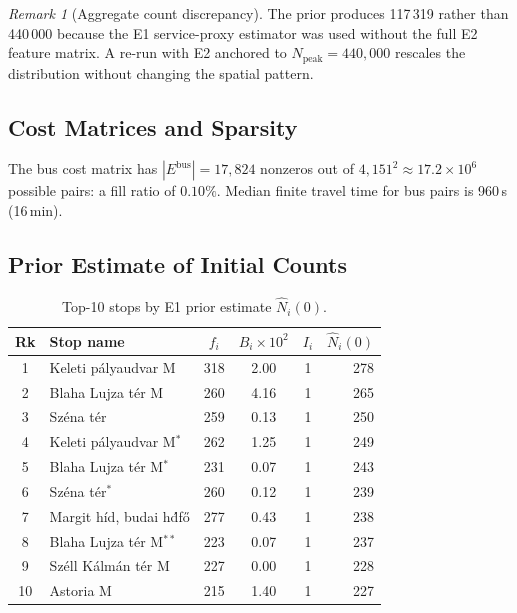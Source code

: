 \documentclass[11pt,a4paper]{article}
\theoremstyle{plain}
\theoremstyle{definition}
\theoremstyle{remark}
\newtheorem{remark}[theorem]{Remark}
\begin{document}
\begin{remark}[Aggregate count discrepancy]
The prior produces 117\,319 rather than 440\,000 because the E1
service-proxy estimator was used without the full E2 feature matrix.  A
re-run with E2 anchored to $N_{\mathrm{peak}}=440{,}000$ rescales the
distribution without changing the spatial pattern.
\end{remark}

\subsection{Cost Matrices and Sparsity}

The bus cost matrix has $|E^{\mathrm{bus}}|=17{,}824$ nonzeros out of
$4{,}151^2\approx17.2\times10^6$ possible pairs: a fill ratio of $0.10\%$.
Median finite travel time for bus pairs is 960\,s (16\,min).

\subsection{Prior Estimate of Initial Counts}

\begin{table}[h]
\centering
\caption{Top-10 stops by E1 prior estimate $\hat{N}_i(0)$.}
\label{tab:prior-top10}
\begin{tabular}{clcccr}
\toprule
Rk & Stop name & $f_i$ & $B_i\times10^2$ & $I_i$ & $\hat{N}_i(0)$ \\
\midrule
1  & Keleti p\'alyaudvar M            & 318 & 2.00 & 1 & 278 \\
2  & Blaha Lujza t\'er M              & 260 & 4.16 & 1 & 265 \\
3  & Sz\'ena t\'er                    & 259 & 0.13 & 1 & 250 \\
4  & Keleti p\'alyaudvar M$^*$        & 262 & 1.25 & 1 & 249 \\
5  & Blaha Lujza t\'er M$^*$          & 231 & 0.07 & 1 & 243 \\
6  & Sz\'ena t\'er$^*$                & 260 & 0.12 & 1 & 239 \\
7  & Margit h\'id, budai h\'df\H{o}   & 277 & 0.43 & 1 & 238 \\
8  & Blaha Lujza t\'er M$^{**}$       & 223 & 0.07 & 1 & 237 \\
9  & Sz\'ell K\'alm\'an t\'er M       & 227 & 0.00 & 1 & 228 \\
10 & Astoria M                        & 215 & 1.40 & 1 & 227 \\
\bottomrule
\end{tabular}
\end{table}
\end{document}
